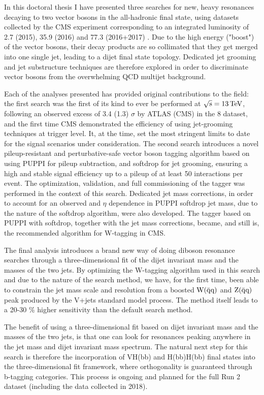 \noindent In this doctoral thesis I have presented three searches for new, heavy resonances decaying to two vector bosons in the all-hadronic final state, using datasets collected by the CMS experiment corresponding to an integrated luminosity of 2.7 (2015), 35.9 (2016) and 77.3 (2016+2017) \fbinv. Due to the high energy ("boost") of the vector bosons, their decay products are so collimated that they get merged into one single jet, leading to a dijet final state topology.
Dedicated jet grooming and jet substructure techniques are therefore explored in order to discriminate vector bosons from the overwhelming QCD multijet background. \par
Each of the analyses presented has provided original contributions to the field: the first search was the first of its kind to ever be performed at $\sqrt{\rm{s}}=13 \,\text{Te\hspace{-.08em}V}$, following an observed excess of 3.4 (1.3) $\sigma$ by ATLAS (CMS) in the 8 \TeV dataset, and the first time CMS demonstrated the efficiency of using jet-grooming techniques at trigger level. It, at the time, set the most stringent limits to date for the signal scenarios under consideration. The second search introduces a novel pileup-resistant and perturbative-safe vector boson tagging algorithm based on using PUPPI for pileup subtraction, and softdrop for jet grooming, ensuring a high and stable signal efficiency up to a pileup of at least 50 interactions per event. The optimization, validation, and full commissioning of the tagger was performed in the context of this search. Dedicated jet mass corrections, in order to account for an observed \PT and $\eta$ dependence in PUPPI softdrop jet mass, due to the nature of the softdrop algorithm, were also developed. The tagger based on PUPPI with softdrop, together with the jet mass corrections, became, and still is, the recommended algorithm for W-tagging in CMS. \par
The final analysis introduces a brand new way of doing diboson resonance searches through a three-dimensional fit of the dijet invariant mass and the masses of the two jets. By optimizing the W-tagging algorithm used in this search and due to the nature of the search method, we have, for the first time, been able to constrain the jet mass scale and resolution from a boosted  $\mathrm{W}(\bar{\rm{q}}\rm{q})$ and $\mathrm{Z}(\bar{\rm{q}}\rm{q})$ peak produced by the V+jets standard model process. The method itself leads to a 20-30 \% higher sensitivity than the default search method.\par
The benefit of using a three-dimensional fit based on dijet invariant mass and the masses of the two jets, is that one can look for resonances peaking anywhere in the jet mass and dijet invariant mass spectrum. The natural next step for this search is therefore the incorporation of VH(bb) and H(bb)H(bb) final states into the three-dimensional fit framework, where orthogonality is guaranteed through b-tagging categories. This process is ongoing and planned for the full Run 2 dataset (including the data collected in 2018).\newline
